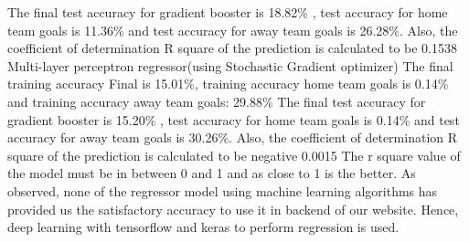 The final test accuracy for gradient booster is 18.82\% , test accuracy for home team goals is 11.36\% and test accuracy for away team goals is 26.28\%. Also, the coefficient of determination R square of the prediction is calculated to be 0.1538 \newline
Multi-layer perceptron regressor(using Stochastic Gradient optimizer)\newline
The final training accuracy Final is 15.01\%, training accuracy home team goals is 0.14\% and training accuracy away team goals: 29.88\% \newline
The final test accuracy for gradient booster is 15.20\% , test accuracy for home team goals is 0.14\% and test accuracy for away team goals is 30.26\%. Also, the coefficient of determination R square of the prediction is calculated to be negative 0.0015 \newline 
The r square value of the model must be in between 0 and 1 and as close to 1 is the better.\newline
As observed, none of the regressor model using machine learning algorithms has provided us the satisfactory accuracy to use it in backend of our website. Hence, deep learning with tensorflow and keras to perform regression is used.\newline
